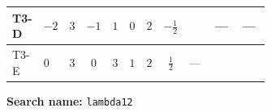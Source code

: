 \documentclass[8pt]{article}
\begin{document}
\begin{landscape}
\begin{longtable}{@{}llcccccc >{\raggedright\arraybackslash}p{0.21\linewidth} >{\raggedright\arraybackslash}p{0.21\linewidth} >{\raggedright\arraybackslash}p{0.21\linewidth}@{}}
\midrule
T3-D & $-2$ & $3$ & $-1$ & $1$ & $0$ & $2$ & $-\frac{1}{2}$ & \scriptsize\adjustbox{max width=\linewidth}{$\begin{gathered} +4 {\lambda_{12}} {\lambda_{S_1}^{\rm Adj}}\end{gathered}$} & --- & --- \\
\midrule
T3-E & $0$ & $3$ & $0$ & $3$ & $1$ & $2$ & $\frac{1}{2}$ & --- & \scriptsize\adjustbox{max width=\linewidth}{$\begin{gathered} \frac{4}{3} {\lambda_{T3}} \left({\lambda_{T3}}\right)^{*}\end{gathered}$} & \scriptsize\adjustbox{max width=\linewidth}{$\begin{gathered} +16 {g_2}^4\end{gathered}$} \\
\midrule
\bottomrule
\end{longtable}
\clearpage
\noindent\textbf{Search name: }\texttt{lambda12}\par\smallskip

\end{landscape}
\end{document}
